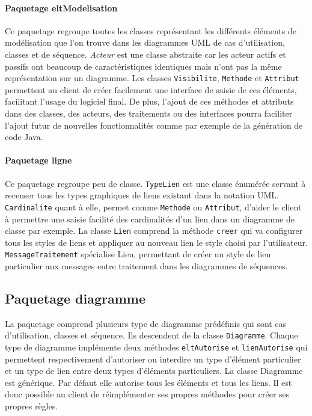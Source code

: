\documentclass[12pt,a4paper,oneside]{book}
\begin{document}
	\paragraph{Paquetage eltModelisation} Ce paquetage regroupe toutes les classes représentant les différents éléments de 
	modélisation que l'on trouve dans les diagrammes UML de cas d'utilisation, classes et de séquence. \textit{Acteur} 
	est une classe abstraite car les acteur actifs et passifs ont beaucoup de caractéristiques identiques mais n'ont pas 
	la même représentation sur un diagramme. Les classes \texttt{Visibilite}, \texttt{Methode} et \texttt{Attribut} permettent au client de créer 
	facilement une interface de saisie de ces éléments, facilitant l'usage du logiciel final. De plus, l'ajout de ces 
	méthodes et attributs dans des classes, des acteurs, des traitements ou des interfaces pourra faciliter l'ajout futur 
	de nouvelles fonctionnalités comme par exemple de la génération de code Java.
	\paragraph{Paquetage ligne} Ce paquetage regroupe peu de classe. \texttt{TypeLien} est une classe énumérée servant à recenser
	tous les types graphiques de liens existant dans la notation UML. \texttt{Cardinalite} quant à elle, permet comme \texttt{Methode} 
	ou \texttt{Attribut}, d'aider le client à permettre une saisie facilité des cardinalités d'un lien dans un diagramme de classe par exemple.
	La classe \texttt{Lien} comprend la méthode \texttt{creer} qui va configurer tous les styles de liens et appliquer au nouveau lien
	le style choisi par l'utilisateur. \texttt{MessageTraitement} spécialise Lien, permettant de créer un style de lien particulier
	aux messages entre traitement dans les diagrammes de séquences.
	\subsection{Paquetage diagramme}
	La paquetage  comprend plusieurs type de diagramme prédéfinis qui sont cas d'utilisation, classes et séquence.
	Ils descendent de la classe \texttt{Diagramme}. Chaque type de diagramme implémente deux méthodes \texttt{eltAutorise} et \texttt{lienAutorise}
	qui permettent respectivement d'autoriser ou interdire un type d'élément particulier et un type de lien entre deux types d'éléments
	particuliers. La classe Diagramme est générique. Par défaut elle autorise tous les éléments et tous les liens. Il est donc possible
	au client de réimplémenter ses propres méthodes pour créer ses propres règles.
\end{document}
